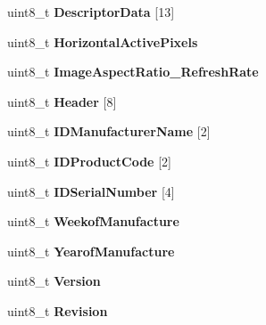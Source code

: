 \begin{DoxyCompactItemize}
uint8\+\_\+t {\bfseries Descriptor\+Data} \mbox{[}13\mbox{]}
\item 
\mbox{\label{structRTEMS__PACKED_ac06abdec69a587f91b0432218fb03513}} 
uint8\+\_\+t {\bfseries Horizontal\+Active\+Pixels}
\item 
\mbox{\label{structRTEMS__PACKED_a7638c09564bbcf1ea5553e4bd2c985ab}} 
uint8\+\_\+t {\bfseries Image\+Aspect\+Ratio\+\_\+\+Refresh\+Rate}
\item 
\mbox{\label{structRTEMS__PACKED_a0cba07a92297a82b9691e377a40608dd}} 
uint8\+\_\+t {\bfseries Header} \mbox{[}8\mbox{]}
\item 
\mbox{\label{structRTEMS__PACKED_aa7304a349b0e7bd8296794ec7b4ee7ae}} 
uint8\+\_\+t {\bfseries I\+D\+Manufacturer\+Name} \mbox{[}2\mbox{]}
\item 
\mbox{\label{structRTEMS__PACKED_add44d2bc58cd384a4a91b28b85a15052}} 
uint8\+\_\+t {\bfseries I\+D\+Product\+Code} \mbox{[}2\mbox{]}
\item 
\mbox{\label{structRTEMS__PACKED_a8a2d0edbc67c055b6c0ed20b895567d8}} 
uint8\+\_\+t {\bfseries I\+D\+Serial\+Number} \mbox{[}4\mbox{]}
\item 
\mbox{\label{structRTEMS__PACKED_ac2f9d141c3a6aeadfb912a41588b62df}} 
uint8\+\_\+t {\bfseries Weekof\+Manufacture}
\item 
\mbox{\label{structRTEMS__PACKED_a8303302bf2740a455a3f7b5b3c5ad9a2}} 
uint8\+\_\+t {\bfseries Yearof\+Manufacture}
\item 
\mbox{\label{structRTEMS__PACKED_a5d56ccdb4f7e06c653cec210dc0f0bcf}} 
uint8\+\_\+t {\bfseries Version}
\item 
\mbox{\label{structRTEMS__PACKED_a743f556f38818a2a25d2e991c5c4ae57}} 
uint8\+\_\+t {\bfseries Revision}
\item 
\mbox{\label{structRTEMS__PACKED_aadba887caaee7c3f413cbb3bb709c8ff}} 

\end{DoxyCompactItemize}
